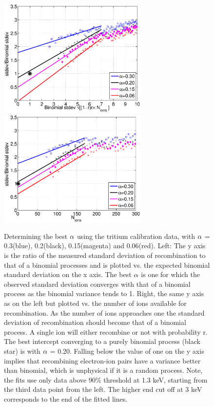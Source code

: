 \renewcommand{\baselinestretch}{1}
\small\normalsize
\begin{figure}[h!]\centering
\includegraphics[width=74mm]{Chapter_Flucs/Figures/alpha/bino_norm_amp_iter1.eps}
\includegraphics[width=74mm]{Chapter_Flucs/Figures/alpha/bino_norm_amp_ions_iter1.eps}
\caption{Determining the best $\rm \alpha$ using the tritium calibration data, with $\rm \alpha$ = 0.3(blue), 0.2(black), 0.15(magenta) and 0.06(red). Left: The y axis is the ratio of the measured standard deviation of recombination to that of a binomial processes and is plotted vs. the expected binomial standard deviation on the x axis. The best $\rm \alpha$ is one for which the observed standard deviation converges with that of a binomial process as the binomial variance tends to 1. Right, the same y axis as on the left but plotted vs. the number of ions available for recombination. As the number of ions approaches one the standard deviation of recombination should become that of a binomial process. A single ion will either recombine or not with probability r.  The best intercept converging to a purely binomial process (black star) is with $\rm \alpha$ = 0.20. Falling below the value of one on the y axis implies that recombining electron-ion pairs have a variance better than binomial, which is unphysical if it is a random process. Note, the fits use only data above 90\% threshold at 1.3 keV, starting from the third data point from the left. The higher end cut off at  3 keV corresponds to the end of the fitted lines. }
\label{fig:Alpha_T}
\end{figure}
\renewcommand{\baselinestretch}{2}
\small\normalsize

